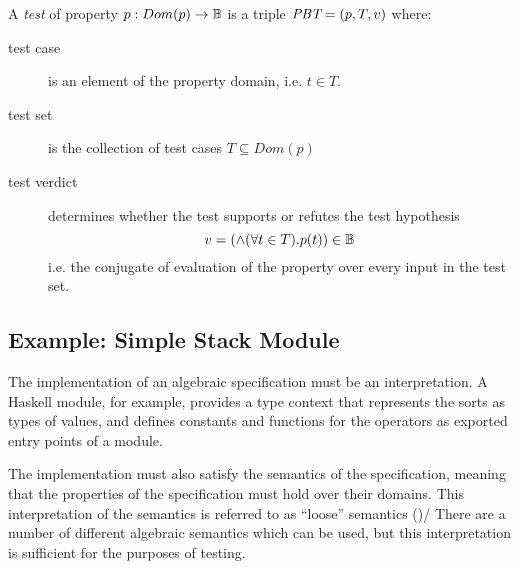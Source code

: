 \begin{df}
A \emph{test} of property $p:Dom(p) \rightarrow \mathbb{B}$ is a triple $\textit{PBT} = (p, T, v)$ where:

\begin{description}
\item[test case] is an element of the property domain, i.e. $t \in T$.
\item[test set] is the collection of test cases $T \subseteq Dom(p)$ 
\item[test verdict] determines whether the test supports or refutes the test hypothesis
$$ v = (\wedge (\forall t \in T) . p(t) ) \in \mathbb{B} $$
\noindent
i.e. the conjugate of evaluation of the property over every input in the test set.
\end{description}
\end{df}


\subsection{Example: Simple Stack Module}\label{sub:ListSpec}

The implementation of an algebraic specification must be an interpretation.
A Haskell module, for example,
provides a type context that represents the sorts as types of values,
and defines constants and functions for the operators as 
exported entry points of a module.

The implementation must also satisfy the semantics of the specification,
meaning that the properties of the specification must hold over their domains.
This interpretation of the semantics is referred to as 
``loose'' semantics (\cite{MeseguerGoguen1986})/
There are a number of different algebraic semantics which can be used,
but this interpretation is sufficient for the purposes of testing.


